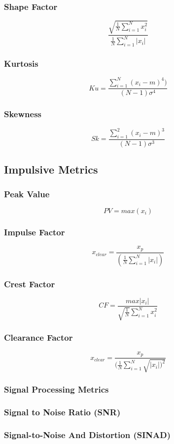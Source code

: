 \documentclass{article}
\begin{document}
\subsubsection{Shape Factor}
$$ \frac{ \sqrt{\frac{1}{N} \sum^N_{i=1}x_i^2} }  {\frac{1}{N}\sum^N_{i=1}|x_i|} $$
\subsubsection{Kurtosis} 
$$ Ku = \frac{\sum^N_{i=1}(x_i-m)^4)}{(N-1)\sigma^4} $$ 
\subsubsection{Skewness} 
$$ Sk = \frac{\sum^2_{i=1}(x_i-m)^3}{(N-1)\sigma^3} $$
  
\subsection{Impulsive Metrics}  
\subsubsection{Peak Value}
$$ PV = max(x_i) $$ 
\subsubsection{Impulse Factor} 
$$ x_{clear} = \frac{x_p}{(\frac{1}{N}\sum^N_{i=1}|x_i|)} $$  
\subsubsection{Crest Factor} 
$$ CF = \frac{max|x_i|}{\sqrt{\frac{1}{N}}\sum^N_{i=1}x^2_i} $$
\subsubsection{Clearance Factor} 
$$ x_{clear} = \frac{x_p}{(\frac{1}{N}\sum^N_{i=1}\sqrt{|x_i|)^2}} $$
  
\subsubsection{Signal Processing Metrics}
\subsubsection{Signal to Noise Ratio (SNR)} 
\subsubsection{Signal-to-Noise And Distortion (SINAD)} 
\end{document}
